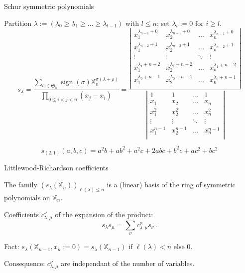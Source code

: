 \documentclass[compress,11pt]{beamer}
\newcommand{\XX}{{\mathbb X}}
\newcommand{\SG}{{\mathfrak S}}
\begin{document}
\begin{frame}{Schur symmetric polynomials}

  \begin{DEFN}
    \small Partition $\lambda := (\lambda_0\geq\lambda_1\geq\dots\geq\lambda_{l-1})$ with $l\leq
    n$; set $\lambda_i:=0$ for $i\geq l$.\\

    \[
    s_{\lambda} = 
    \frac{\sum_{\sigma\in\SG_n} \operatorname{sign}(\sigma)
      \XX_n^{\sigma(\lambda+\rho)}}%
    {\prod_{0\leq i<j<n} (x_j - x_i)}
    = \frac{\left|
       \begin{smallmatrix}
         x_1^{\lambda_{n-1}+0}  & x_2^{\lambda_{n-1}+0}   & \dots  & x_n^{\lambda_{n-1}+0}  \\
         x_1^{\lambda_{n-2}+1}  & x_2^{\lambda_{n-2}+1}   & \dots  & x_n^{\lambda_{n-2}+1}  \\
         \vdots & \vdots & \ddots & \vdots \\
         x_1^{\lambda_1+n-2}  & x_2^{\lambda_1+n-2}   & \dots  & x_n^{\lambda_1+n-2}  \\
         x_1^{\lambda_0+n-1}  & x_2^{\lambda_0+n-1}   & \dots  & x_n^{\lambda_0+n-1}  \\
      \end{smallmatrix}
      \right|
    }{\left|
       \begin{smallmatrix}
         1      & 1      & \dots  & 1     \\
         x_1    & x_2    & \dots  & x_n    \\
         x_1^2  & x_2^2   & \dots  & x_n^2  \\
         \vdots & \vdots & \ddots & \vdots \\
         x_1^{n-1}  & x_2^{n-1}   & \dots  & x_n^{n-1}  \\
      \end{smallmatrix}
      \right|
    }
    \]
  \end{DEFN}
  \[s_{(2,1)}(a,b,c) = a^2b + ab^2 + a^2c + 2abc + b^2c + ac^2 + bc^2\]
\end{frame}


\begin{frame}{Littlewood-Richardson coefficients}

  \begin{PROP}
    The family $(s_\lambda(\XX_n))_{\ell(\lambda) \leq n}$ is a (linear) basis of the
    ring of symmetric polynomials on $\XX_n$.
  \end{PROP}

  \begin{DEFN}
    Coefficients $c_{\lambda,\mu}^\nu$ of the expansion of the product:
    \[
    s_\lambda s_\mu = \sum_{\nu} c_{\lambda,\mu}^\nu s_\nu\,.
    \]
  \end{DEFN}
  Fact: $s_\lambda(\XX_{n-1}, x_n := 0) =
  s_\lambda(\XX_{n-1}) \text{ if } \ell(\lambda) < n\text{ else } 0$.

  Consequence: $c_{\lambda,\mu}^\nu$ are independant of the number of variables.
\end{frame}
\end{document}
